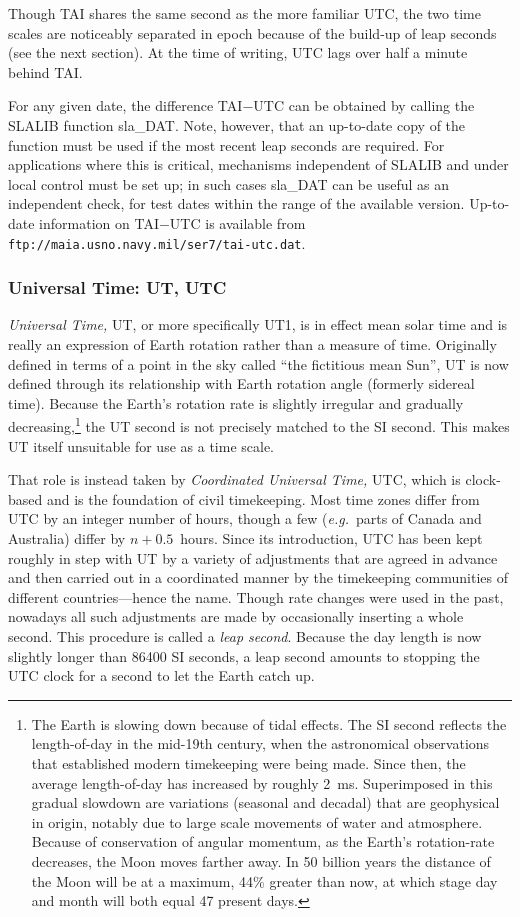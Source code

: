 \documentclass[11pt,twoside,nolof]{starlink}
\begin{document}
Though TAI shares the same second as the more familiar UTC, the
two time scales are noticeably separated in epoch because of the
build-up of leap seconds (see the next section).
At the time of writing, UTC
lags over half a minute behind TAI.

For any given date, the difference TAI$-$UTC
can be obtained by calling the SLALIB function
sla\_DAT.
Note, however, that an up-to-date copy of the function must be used if
the most recent leap seconds are required.  For applications
where this is critical, mechanisms independent of SLALIB
and under local control must
be set up;  in such cases
sla\_DAT
can be useful as an
independent check, for test dates within the range of the
available version.  Up-to-date information on TAI$-$UTC is available
from \texttt{ftp://maia.usno.navy.mil/ser7/tai-utc.dat}.

\subsubsection{Universal Time: UT, UTC}
\label{UTC}
\textit{Universal Time,} UT, or more specifically UT1,
is in effect mean solar time and is really an expression
of Earth rotation rather than a measure of time.
Originally
defined in terms of a point in the sky called ``the fictitious
mean Sun'', UT is now defined through its relationship
with Earth rotation angle
(formerly sidereal time).
Because the Earth's rotation rate is slightly irregular and
gradually decreasing,\footnote{The Earth is slowing
down because of tidal effects.  The SI
second reflects the length-of-day in the mid-19th century, when
the astronomical observations that established modern timekeeping
were being made.  Since then,
the average length-of-day has increased by roughly 2~ms.
Superimposed in this gradual slowdown are
variations (seasonal and decadal) that are geophysical in origin,
notably due to large scale movements of water and atmosphere.
Because of
conservation of angular momentum, as the Earth's rotation-rate
decreases, the Moon moves farther away.  In 50 billion years the
distance of the Moon will be at a maximum, 44\% greater than now, at
which stage day and month will both equal 47 present days.}
the UT second is not precisely
matched to the SI second.  This makes UT itself unsuitable for
use as a time scale.

That role is instead taken by
\textit{Coordinated Universal Time,} UTC, which is clock-based and
is the foundation of civil timekeeping.
Most time zones differ from UTC by an integer number
of hours, though a few (\textit{e.g.}\ parts of Canada and Australia) differ
by $n+0.5$~hours.  Since its introduction, UTC has been kept
roughly in step with UT by a variety of adjustments that are
agreed in advance and then carried out in a coordinated manner by
the timekeeping communities of different countries---hence the
name.  Though rate
changes were used in the past, nowadays all such adjustments
are made by occasionally inserting
a whole second.  This procedure is called
a \textit{leap second}.  Because the day length is now slightly longer
than 86400 SI seconds, a leap second amounts to stopping the UTC
clock for a second to let the Earth catch up.
\end{document}
